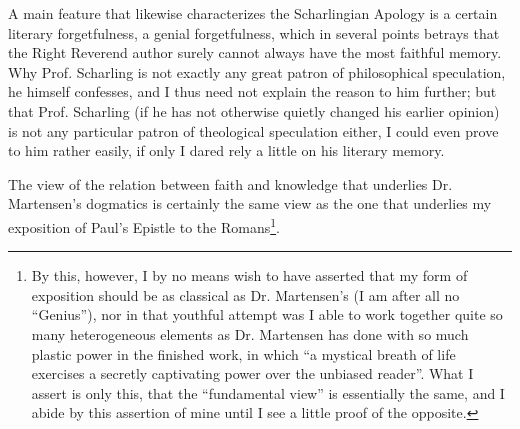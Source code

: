 \documentclass[12pt,a4paper,openany]{book}
\begin{document}
A main feature that likewise characterizes the Scharlingian
Apology is a certain literary forgetfulness, a genial
forgetfulness, which in several points betrays that
the Right Reverend author surely cannot always have
the most faithful memory. Why Prof. Scharling is not
exactly any great patron of philosophical
speculation, he himself confesses, and I thus need
not explain the reason to him further; but that Prof.
Scharling (if he has not otherwise quietly changed
his earlier opinion) is not any particular
patron of theological speculation either, I could even
prove to him rather easily, if only I dared
rely a little on his literary memory.

The view of the relation between faith and knowledge
that underlies Dr. Martensen's dogmatics is
certainly the same view as the one that underlies
my exposition of Paul's Epistle to the Romans\footnote[1]{By this, however, I by no means wish to have asserted that my form of exposition should be as classical as Dr. Martensen's (I am after all no ``Genius''), nor in that youthful attempt was I able to work together quite so many heterogeneous elements as Dr. Martensen has done with so much plastic power in the finished work, in which ``a mystical breath of life exercises a secretly captivating power over the unbiased reader''. What I assert is only this, that the ``fundamental view'' is essentially the same, and I abide by this assertion of mine until I see a little proof of the opposite.}.
\end{document}
